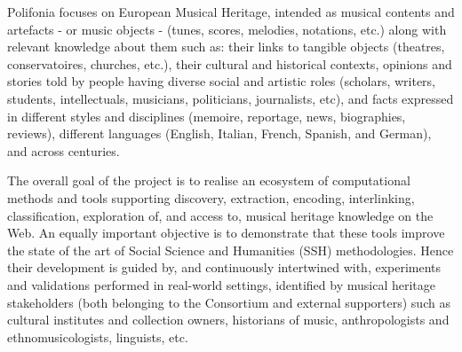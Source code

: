 Polifonia focuses on European Musical Heritage, intended as musical contents and artefacts - or music objects - (tunes, scores, melodies, notations, etc.) along with relevant knowledge about them such as: their links to tangible objects (theatres, conservatoires, churches, etc.), their cultural and historical contexts, opinions and stories told by people having diverse social and artistic roles (scholars, writers, students, intellectuals, musicians, politicians, journalists, etc), and facts expressed in different styles and disciplines (memoire, reportage, news, biographies, reviews), different languages (English, Italian, French, Spanish, and German), and across centuries.

The overall goal of the project is to realise an ecosystem of computational methods and tools supporting discovery, extraction, encoding, interlinking, classification, exploration of, and access to, musical heritage knowledge on the Web. An equally important objective is to demonstrate that these tools improve the state of the art of Social Science and Humanities (SSH) methodologies. Hence their development is guided by, and continuously intertwined with, experiments and validations performed in real-world settings, identified by musical heritage stakeholders (both belonging to the Consortium and external supporters) such as cultural institutes and collection owners, historians of music, anthropologists and ethnomusicologists, linguists, etc.

\clearpage

\pagestyle{empty}


